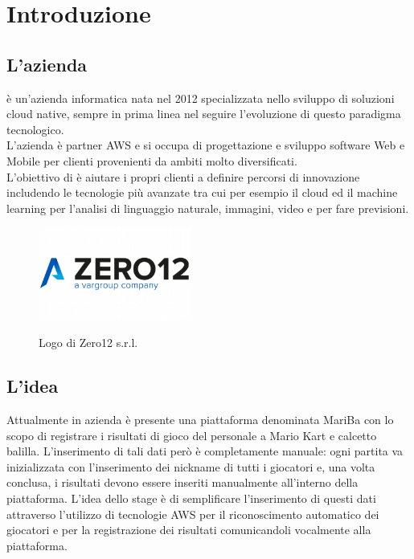 
\chapter{Introduzione}
\label{cap:introduzione}

\section{L'azienda}

\azienda è un'azienda informatica nata nel 2012 specializzata nello sviluppo di soluzioni cloud native, sempre in prima linea nel seguire l'evoluzione di questo paradigma tecnologico. \\
L'azienda è partner \gls{AWS} e si occupa di progettazione e sviluppo software Web e Mobile per clienti provenienti da ambiti molto diversificati. \\
L'obiettivo di \azienda è aiutare i propri clienti a definire percorsi di innovazione includendo le tecnologie più avanzate tra cui per esempio
il cloud ed il machine learning per l'analisi di linguaggio naturale, immagini, video e per fare previsioni. 

	\begin{figure}[H]
		\centering
		\includegraphics[width=5cm]{immagini/logo-zero12.png} \\
		\caption{\label{fig:logo_zero12} Logo di Zero12 s.r.l.}
	\end{figure}

\section{L'idea}
	Attualmente in azienda è presente una piattaforma denominata MariBa con lo scopo di registrare i risultati di gioco del personale a Mario Kart e calcetto balilla. L'inserimento di tali dati però è completamente manuale: ogni partita va
	inizializzata con l'inserimento dei nickname di tutti i giocatori e, una volta conclusa, i risultati devono
	essere inseriti manualmente all'interno della piattaforma. L'idea dello stage è di semplificare l'inserimento di questi
	dati attraverso l'utilizzo di tecnologie \gls{AWS} per il riconoscimento automatico dei giocatori e per la registrazione dei risultati comunicandoli vocalmente alla piattaforma.



